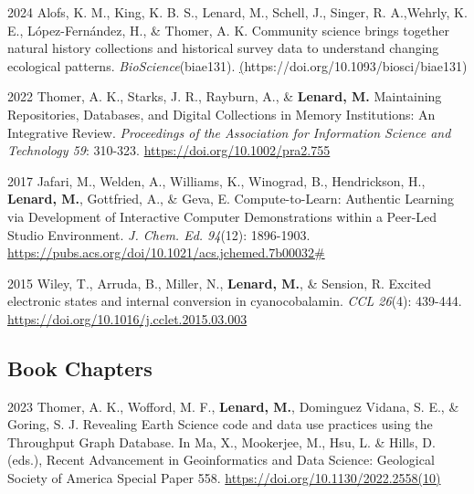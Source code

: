 \documentclass[12pt,letterpaper]{report}
\begin{document}
\begin{tablist}

	\item[2024] \tab Alofs, K. M., King, K. B. S., Lenard, M., Schell, J., Singer, R. A.,Wehrly, K. E., López-Fernández, H., \& Thomer, A. K. Community science brings together natural history
collections and historical survey data to understand changing ecological patterns. \textit{BioScience}(biae131). \href{https://doi.org/10.1093/biosci/biae131}(https://doi.org/10.1093/biosci/biae131)
   
 	\item[2022] \tab Thomer, A. K., Starks, J. R., Rayburn, A., \& \textbf{Lenard, M.} Maintaining Repositories, Databases, and Digital Collections in Memory Institutions: An Integrative Review. \textit{Proceedings of the Association for Information Science and Technology 59}: 310-323. \href{https://doi.org/10.1002/pra2.755}{https://doi.org/10.1002/pra2.755}
        
 	\item[2017] \tab Jafari, M., Welden, A., Williams, K., Winograd, B., Hendrickson, H., \textbf{Lenard, M.}, Gottfried, A., \& Geva, E. Compute-to-Learn: Authentic Learning via Development of Interactive Computer Demonstrations within a Peer-Led Studio Environment. \textit{J. Chem. Ed. 94}(12): 1896-1903. \href{https://pubs.acs.org/doi/10.1021/acs.jchemed.7b00032\#}{https://pubs.acs.org/doi/10.1021/acs.jchemed.7b00032\#}

 	\item[2015] \tab Wiley, T., Arruda, B., Miller, N., \textbf{Lenard, M.}, \& Sension, R. Excited electronic states and internal conversion in cyanocobalamin. \textit{CCL 26}(4): 439-444. \href{https://doi.org/10.1016/j.cclet.2015.03.003}{https://doi.org/10.1016/j.cclet.2015.03.003}

\end{tablist}

\subsection*{Book Chapters}

\begin{tablist}

	\item[2023] \tab Thomer, A. K., Wofford, M. F., \textbf{Lenard, M.}, Dominguez Vidana, S. E., \& Goring, S. J. Revealing Earth Science code and data use practices using the Throughput Graph Database. In Ma, X., Mookerjee, M., Hsu, L. \& Hills, D. (eds.), Recent Advancement in Geoinformatics and Data Science: Geological Society 
of America Special Paper 558. \href{https://doi.org/10.1130/2022.2558(10)}{https://doi.org/10.1130/2022.2558(10)}
	
\end{tablist}
\end{document}
